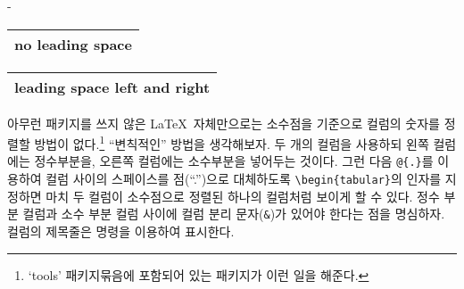 \begin{adjustwidth}{0pt}{-\margheadwidth}

\begin{example}
\begin{tabular}{@{} l @{}}
\hline
no leading space\\
\hline
\end{tabular}
\end{example}

\vspace{-.5\onelineskip}

\begin{example}
\begin{tabular}{l}
\hline
leading space left and right\\
\hline
\end{tabular}
\end{example}


아무런 패키지를 쓰지 않은 \LaTeX\ 자체만으로는 소수점을 기준으로 컬럼의 숫자를 정렬할 방법이 없다.\footnote{%
  `tools' 패키지묶음에 포함되어 있는  패키지가 이런 일을 해준다.
}
``변칙적인'' 방법을 생각해보자. 두 개의 컬럼을 사용하되 왼쪽 컬럼에는 정수부분을, 오른쪽 컬럼에는 소수부분을 넣어두는 것이다.
그런 다음 \verb|@{.}|를 이용하여 컬럼 사이의 스페이스를 점(``.'')으로 대체하도록 \verb|\begin{tabular}|의 인자를
  지정하면 마치 두 컬럼이 소수점으로 정렬된 하나의 컬럼처럼 보이게 할 수 있다.
정수 부분 컬럼과 소수 부분 컬럼 사이에 컬럼 분리 문자(\verb|&|)가 있어야 한다는 점을 명심하자.
컬럼의 제목줄은  명령을 이용하여 표시한다.


\end{adjustwidth}
